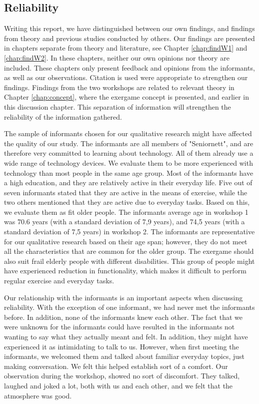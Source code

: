 \subsection{Reliability}
Writing this report, we have distinguished between our own findings, and findings from theory and previous studies conducted by others. Our findings are presented in chapters separate from theory and literature, see Chapter \ref{chap:findW1} and \ref{chap:findW2}. In these chapters, neither our own opinions nor theory are included. These chapters only present feedback and opinions from the informants, as well as our observations. Citation is used were appropriate to strengthen our findings.  Findings from the two workshops are related to relevant theory in Chapter \ref{chap:concept}, where the exergame concept is presented, and earlier in this discussion chapter. This separation of information will strengthen the reliability of the information gathered.

The sample of informants chosen for our qualitative research might have affected the quality of our study. The informants are all members of "Seniornett", and are therefore very committed to learning about technology. All of them already use a wide range of technology devices. We evaluate them to be more experienced with technology than most people in the same age group. Most of the informants have a high education, and they are relatively active in their everyday life. Five out of seven informants stated that they are active in the means of exercise, while the two others mentioned that they are active due to everyday tasks. Based on this, we evaluate them as fit older people. The informants average age in workshop 1 was 70.6 years (with a standard deviation of 7,9 years), and 74,5 years (with a standard deviation of 7,5 years) in workshop 2. The informants are representative for our qualitative research based on their age span; however, they do not meet all the characteristics that are common for the older group. The exergame should also suit frail elderly people with different disabilities. This group of people might have experienced reduction in functionality, which makes it difficult to perform regular exercise and everyday tasks. 

Our relationship with the informants is an important aspects when discussing reliability. With the exception of one informant, we had never met the informants before. In addition, none of the informants knew each other. The fact that we were unknown for the informants could have resulted in the informants not wanting to say what they actually meant and felt. In addition, they might have experienced it as intimidating to talk to us. However, when first meeting the informants, we welcomed them and talked about familiar everyday topics, just making conversation. We felt this helped establish sort of a comfort. Our observation during the workshop, showed no sort of discomfort. They talked, laughed and joked a lot, both with us and each other, and we felt that the atmosphere was good. 

